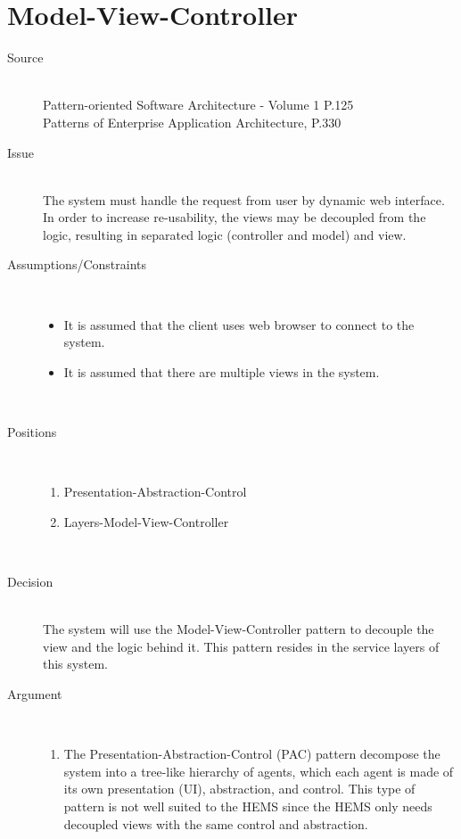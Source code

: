 \section{Model-View-Controller}
\begin{description}
\item [Source]~\\
Pattern-oriented Software Architecture - Volume 1 P.125 \cite{wiley-1}\\
Patterns of Enterprise Application Architecture, P.330 \cite{Fowler:2002:PEA:579257}

\item [Issue]~\\
The system must handle the request from user by dynamic web interface. In order to increase re-usability, the views may be decoupled from the logic, resulting in separated logic (controller and model) and view.

\item [Assumptions/Constraints]~
\begin{itemize}
\item It is assumed that the client uses web browser to connect to the system.
\item It is assumed that there are multiple views in the system.
\end{itemize}
~\\[-1.5cm]

\item [Positions]~
\begin{enumerate}
\item Presentation-Abstraction-Control
\item Layers-Model-View-Controller
\end{enumerate}
~\\[-1.5cm]

\item [Decision] ~\\
The system will use the Model-View-Controller pattern to decouple the view and the logic behind it. This pattern resides in the service layers of this system.

\item [Argument]~
\begin{enumerate}
\item The Presentation-Abstraction-Control (PAC) pattern decompose the system into a tree-like hierarchy of agents, which each agent is made of its own presentation (UI), abstraction, and control. This type of pattern is not well suited to the HEMS since the HEMS only needs decoupled views with the same control and abstraction.


\end{enumerate}
\end{description}
